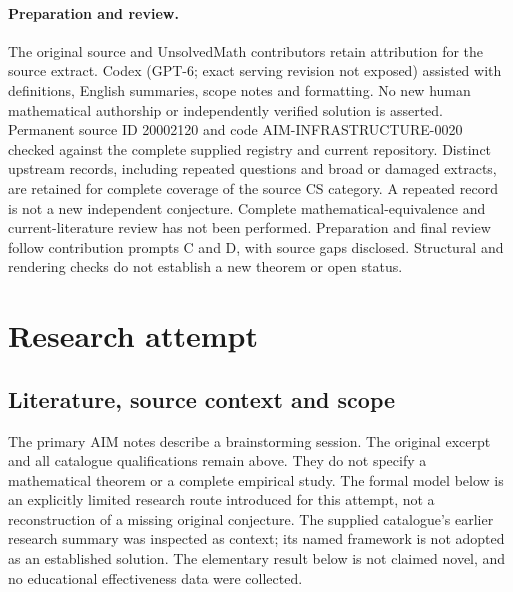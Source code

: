 \documentclass[11pt]{article}
\begin{document}
\paragraph{Preparation and review.}
The original source and UnsolvedMath contributors retain attribution for the source extract. Codex (GPT-6; exact serving revision not exposed) assisted with definitions, English summaries, scope notes and formatting. No new human mathematical authorship or independently verified solution is asserted. Permanent source ID 20002120 and code AIM-INFRASTRUCTURE-0020 checked against the complete supplied registry and current repository. Distinct upstream records, including repeated questions and broad or damaged extracts, are retained for complete coverage of the source CS category. A repeated record is not a new independent conjecture. Complete mathematical-equivalence and current-literature review has not been performed. Preparation and final review follow contribution prompts C and D, with source gaps disclosed. Structural and rendering checks do not establish a new theorem or open status.
\label{end:20002120}

\section{Research attempt}
\subsection{Literature, source context and scope}
The primary AIM notes describe a brainstorming session. The original excerpt and all catalogue qualifications remain above. They do not specify a mathematical theorem or a complete empirical study. The formal model below is an explicitly limited research route introduced for this attempt, not a reconstruction of a missing original conjecture. The supplied catalogue's earlier research summary was inspected as context; its named framework is not adopted as an established solution. The elementary result below is not claimed novel, and no educational effectiveness data were collected.
\end{document}
